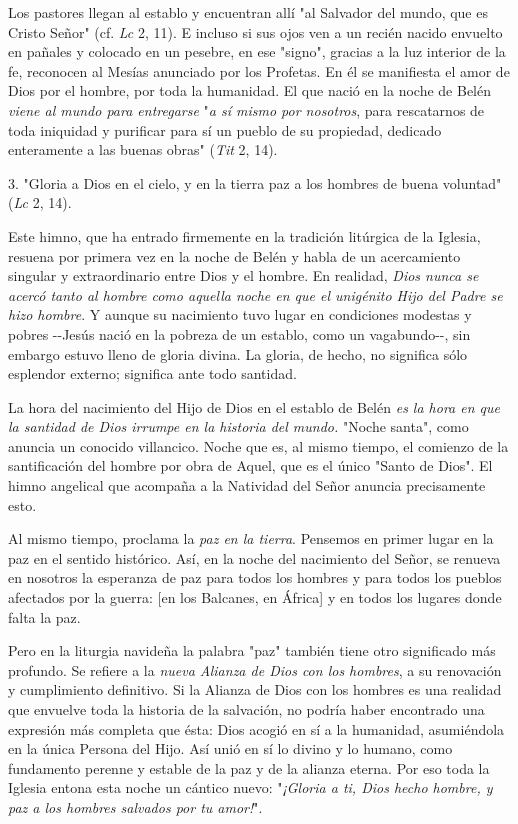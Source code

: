 Los pastores llegan al establo y encuentran allí "al Salvador del mundo,
que es Cristo Señor" (cf. \emph{Lc} 2, 11). E incluso si sus ojos ven a
un recién nacido envuelto en pañales y colocado en un pesebre, en ese
"signo", gracias a la luz interior de la fe, reconocen al Mesías
anunciado por los Profetas. En él se manifiesta el amor de Dios por el
hombre, por toda la humanidad. El que nació en la noche de Belén
\emph{viene al mundo para entregarse} "\emph{a sí mismo por nosotros},
para rescatarnos de toda iniquidad y purificar para sí un pueblo de su
propiedad, dedicado enteramente a las buenas obras" (\emph{Tit} 2, 14).

3. "Gloria a Dios en el cielo, y en la tierra paz a los hombres de buena
voluntad" (\emph{Lc} 2, 14).

Este himno, que ha entrado firmemente en la tradición litúrgica de la
Iglesia, resuena por primera vez en la noche de Belén y habla de un
acercamiento singular y extraordinario entre Dios y el hombre. En
realidad, \emph{Dios nunca se acercó tanto al hombre como aquella noche
	en que el unigénito Hijo del Padre se hizo hombre}. Y aunque su
nacimiento tuvo lugar en condiciones modestas y pobres -\/-Jesús nació
en la pobreza de un establo, como un vagabundo-\/-, sin embargo estuvo
lleno de gloria divina. La gloria, de hecho, no significa sólo esplendor
externo; significa ante todo santidad.

La hora del nacimiento del Hijo de Dios en el establo de Belén \emph{es
	la hora en que la santidad de Dios irrumpe en la historia del mundo.}
"Noche santa", como anuncia un conocido villancico. Noche que es, al
mismo tiempo, el comienzo de la santificación del hombre por obra de
Aquel, que es el único "Santo de Dios". El himno angelical que acompaña
a la Natividad del Señor anuncia precisamente esto.

Al mismo tiempo, proclama la \emph{paz en la tierra}. Pensemos en primer
lugar en la paz en el sentido histórico. Así, en la noche del nacimiento
del Señor, se renueva en nosotros la esperanza de paz para todos los
hombres y para todos los pueblos afectados por la guerra: {[}en los
Balcanes, en África{]} y en todos los lugares donde falta la paz.

Pero en la liturgia navideña la palabra "paz" también tiene otro
significado más profundo. Se refiere a la \emph{nueva Alianza de Dios
	con los hombres}, a su renovación y cumplimiento definitivo. Si la
Alianza de Dios con los hombres es una realidad que envuelve toda la
historia de la salvación, no podría haber encontrado una expresión más
completa que ésta: Dios acogió en sí a la humanidad, asumiéndola en la
única Persona del Hijo. Así unió en sí lo divino y lo humano, como
fundamento perenne y estable de la paz y de la alianza eterna. Por eso
toda la Iglesia entona esta noche un cántico nuevo: "\emph{¡Gloria a ti,
	Dios hecho hombre, y paz a los hombres salvados por tu amor!}".

